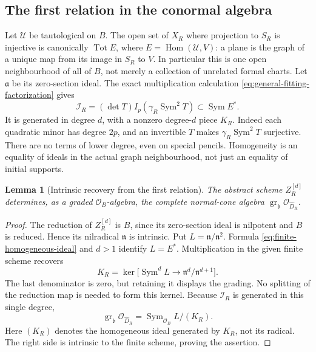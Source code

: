 \documentclass[11pt,reqno]{amsart}
\numberwithin{equation}{section}
\newtheorem{lemma}[theorem]{Lemma}
\theoremstyle{definition}\newtheorem{definition}[theorem]{Definition}
\theoremstyle{remark}\newtheorem{remark}[theorem]{Remark}
\newcommand{\OO}{\mathcal O}\newcommand{\II}{\mathcal I}
\DeclareMathOperator{\Sym}{Sym}\DeclareMathOperator{\Gr}{Gr}
\DeclareMathOperator{\Hom}{Hom}\DeclareMathOperator{\Tot}{Tot}
\DeclareMathOperator{\gr}{gr}\DeclareMathOperator{\Gal}{Gal}
\begin{document}
\subsection{The first relation in the conormal algebra}

Let \(\mathcal U\) be tautological on \(B\).  The open set
of \(X_R\) where projection to \(S_R\) is injective is
canonically \(\Tot E\), where
\(E=\Hom(\mathcal U,V)\): a plane is the graph of a unique
map from its image in \(S_R\) to \(V\).  In particular this
is one open neighbourhood of all of \(B\), not merely a
collection of unrelated formal charts.  Let \(\mathfrak a\)
be its zero-section ideal.  The exact multiplication calculation
\eqref{eq:general-fitting-factorization} gives
\begin{equation}\label{eq:finite-homogeneous-ideal}
 \mathcal I_R=(\det T)I_p(\gamma_R\Sym^2T)
            \subset\Sym E^*.
\end{equation}
It is generated in degree \(d\), with a nonzero degree-\(d\)
piece \(K_R\).  Indeed each quadratic minor has degree \(2p\),
and an invertible \(T\) makes \(\gamma_R\Sym^2T\)
surjective.  There are no terms of lower degree, even on special
pencils.  Homogeneity is an equality of ideals in the actual graph
neighbourhood, not just an equality of initial supports.

\begin{lemma}[Intrinsic recovery from the first relation]
\label{lem:first-relation-cone}
The abstract scheme \(Z_R^{[d]}\) determines, as a graded
\(\OO_B\)-algebra, the complete normal-cone algebra
\(\gr_{\mathfrak b}\OO_{\widehat D_R}\).
\end{lemma}
\begin{proof}
The reduction of \(Z_R^{[d]}\) is \(B\), since its
zero-section ideal is nilpotent and \(B\) is reduced.  Hence
its nilradical \(\mathfrak n\) is intrinsic.  Put
\(L=\mathfrak n/\mathfrak n^2\).  Formula
\eqref{eq:finite-homogeneous-ideal} and \(d>1\) identify
\(L=E^*\).  Multiplication in the given finite scheme recovers
\begin{equation}\label{eq:intrinsic-first-relation}
 K_R=\ker\bigl[\Sym^d L\longrightarrow
                    \mathfrak n^d/\mathfrak n^{d+1}\bigr].
\end{equation}
The last denominator is zero, but retaining it displays the grading.
No splitting of the reduction map is needed to form this kernel.
Because \(\mathcal I_R\) is generated in this single degree,
\begin{equation}\label{eq:finite-cone-completion}
 \gr_{\mathfrak b}\OO_{\widehat D_R}
       =\Sym_{\OO_B}L/(K_R).
\end{equation}
Here \((K_R)\) denotes the homogeneous ideal generated by
\(K_R\), not its radical.  The right side is intrinsic to the
finite scheme, proving the assertion.
\end{proof}
\end{document}
